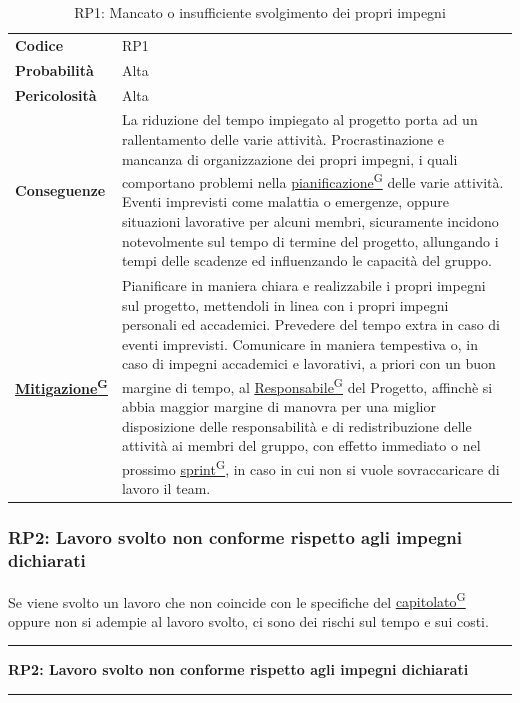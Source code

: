 \documentclass[a4paper,12pt]{article}
\providecommand{\glslink}[2]{\href{https://alittlebyte-19.github.io/Documentazione/glossario.html\#gls-#1}{\underline{#2}\textsuperscript{\scriptsize G}}}
\begin{document}
\begin{table}[h]
\begin{tabular}{>{\bfseries}p{3cm} | p{12.2cm}}
Codice & RP1 \\

Probabilità & Alta\\

Pericolosità & Alta\\

Conseguenze & La riduzione del tempo impiegato al progetto porta ad un rallentamento delle varie attività. Procrastinazione e mancanza di organizzazione dei propri impegni,
i quali comportano problemi nella \glslink{pianificazione}{pianificazione} delle varie attività. Eventi imprevisti come malattia o emergenze, oppure situazioni lavorative per alcuni membri, sicuramente 
incidono notevolmente sul tempo di termine del progetto, allungando i tempi delle scadenze ed influenzando le capacità del gruppo.\\

\glslink{mitigazione-dei-rischi}{Mitigazione} & Pianificare in maniera chiara e realizzabile i propri impegni sul progetto, mettendoli in linea con i propri impegni personali ed accademici.
Prevedere del tempo extra in caso di eventi imprevisti. Comunicare in maniera tempestiva o, in caso di impegni accademici e lavorativi, a priori con un buon margine di tempo, al \glslink{responsabile}{Responsabile} del Progetto, affinchè si abbia maggior margine
di manovra per una miglior disposizione delle responsabilità e di redistribuzione delle attività ai membri del gruppo, con effetto immediato o nel prossimo \glslink{sprint}{sprint}, in caso in cui 
non si vuole sovraccaricare di lavoro il team. \\
\end{tabular}
\caption{RP1: Mancato o insufficiente svolgimento dei propri impegni}
\end{table}

\newpage

\subsubsection{RP2: Lavoro svolto non conforme rispetto agli impegni dichiarati}
Se viene svolto un lavoro che non coincide con le specifiche del \glslink{capitolato}{capitolato} oppure non si adempie al lavoro svolto, ci sono dei rischi sul tempo e sui costi.
\vspace{0.5cm}
\hrule
\vspace{0.5em}
\textbf{RP2: Lavoro svolto non conforme rispetto agli impegni dichiarati}
\vspace{0.5em}
\hrule
\vspace{1cm}
\end{document}

